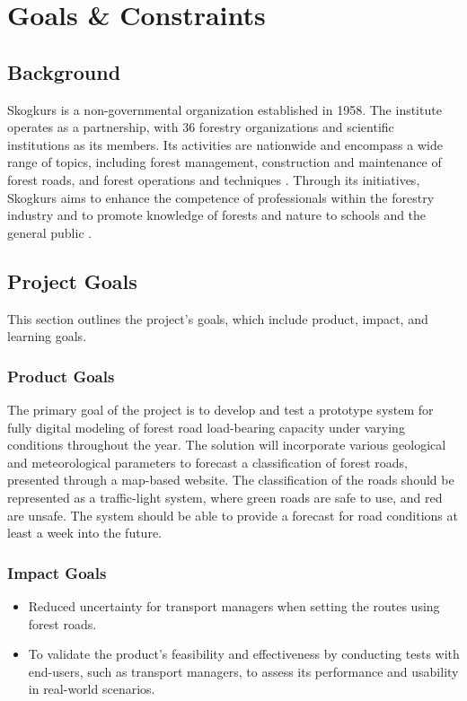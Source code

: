 \section{Goals \& Constraints}
\subsection{Background}
Skogkurs is a non-governmental organization established in 1958. The institute operates as a partnership, with 36 forestry organizations and scientific institutions as its members. Its activities are nationwide and encompass a wide range of topics, including forest management, construction and maintenance of forest roads, and forest operations and techniques \cite{skogkurs_eng}. Through its initiatives, Skogkurs aims to enhance the competence of professionals within the forestry industry and to promote knowledge of forests and nature to schools and the general public \cite{skogkurs_nor}. 


\subsection{Project Goals}
This section outlines the project's goals, which include product, impact, and learning goals.
\subsubsection{Product Goals}
The primary goal of the project is to develop and test a prototype system for fully digital modeling of forest road load-bearing capacity under varying conditions throughout the year. The solution will incorporate various geological and meteorological parameters to forecast a classification of forest roads, presented through a map-based website. The classification of the roads should be represented as a traffic-light system, where green roads are safe to use, and red are unsafe. The system should be able to provide a forecast for road conditions at least a week into the future.

\subsubsection{Impact Goals}
\begin{itemize}
    \item Reduced uncertainty for transport managers when setting the routes using forest roads.
    \item To validate the product's feasibility and effectiveness by conducting tests with end-users, such as transport managers, to assess its performance and usability in real-world scenarios.

\end{itemize}


